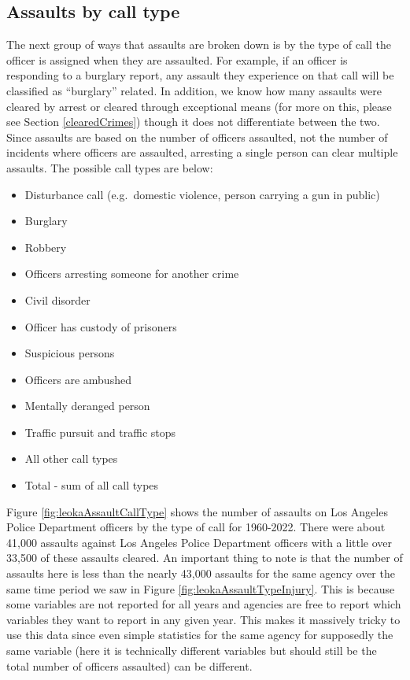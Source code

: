 \documentclass[
]{krantz}
\providecommand{\tightlist}{%
  \setlength{\itemsep}{0pt}\setlength{\parskip}{0pt}}
\begin{document}
\subsection{Assaults by call
type}\label{assaults-by-call-type}

The next group of ways that assaults are broken down is by
the type of call the officer is assigned when they are
assaulted. For example, if an officer is responding to a
burglary report, any assault they experience on that call
will be classified as ``burglary'' related. In addition, we
know how many assaults were cleared by arrest or cleared
through exceptional means (for more on this, please see
Section \ref{clearedCrimes}) though it does not
differentiate between the two. Since assaults are based on
the number of officers assaulted, not the number of
incidents where officers are assaulted, arresting a single
person can clear multiple assaults. The possible call types
are below:

\begin{itemize}
\tightlist
\item
  Disturbance call (e.g.~domestic violence, person carrying
  a gun in public)
\item
  Burglary
\item
  Robbery
\item
  Officers arresting someone for another crime
\item
  Civil disorder
\item
  Officer has custody of prisoners
\item
  Suspicious persons
\item
  Officers are ambushed
\item
  Mentally deranged person
\item
  Traffic pursuit and traffic stops
\item
  All other call types
\item
  Total - sum of all call types
\end{itemize}

Figure \ref{fig:leokaAssaultCallType} shows the number of
assaults on Los Angeles Police Department officers by the
type of call for 1960-2022. There were about 41,000 assaults
against Los Angeles Police Department officers with a little
over 33,500 of these assaults cleared. An important thing to
note is that the number of assaults here is less than the
nearly 43,000 assaults for the same agency over the same
time period we saw in Figure
\ref{fig:leokaAssaultTypeInjury}. This is because some
variables are not reported for all years and agencies are
free to report which variables they want to report in any
given year. This makes it massively tricky to use this data
since even simple statistics for the same agency for
supposedly the same variable (here it is technically
different variables but should still be the total number of
officers assaulted) can be different.
\end{document}
